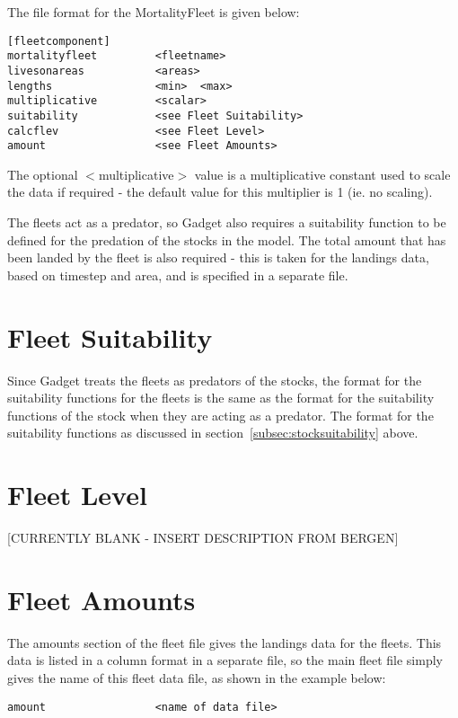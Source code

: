 \documentclass [a4paper, 10pt]{book}
\begin{document}
\bigskip
The file format for the MortalityFleet is given below:

\begin{verbatim}
[fleetcomponent]
mortalityfleet         <fleetname>
livesonareas           <areas>
lengths                <min>  <max>
multiplicative         <scalar>
suitability            <see Fleet Suitability>
calcflev               <see Fleet Level>
amount                 <see Fleet Amounts>
\end{verbatim}

The optional $<$multiplicative$>$ value is a multiplicative constant used to scale the data if required - the default value for this multiplier is 1 (ie. no scaling).

\bigskip
The fleets act as a predator, so Gadget also requires a suitability function to be defined for the predation of the stocks in the model.  The total amount that has been landed by the fleet is also required - this is taken for the landings data, based on timestep and area, and is specified in a separate file.

\section{Fleet Suitability}\label{sec:fleetsuit}
Since Gadget treats the fleets as predators of the stocks, the format for the suitability functions for the fleets is the same as the format for the suitability functions of the stock when they are acting as a predator.  The format for the suitability functions as discussed in section~\ref{subsec:stocksuitability} above.

\section{Fleet Level}\label{sec:fleetlevel}
[CURRENTLY BLANK - INSERT DESCRIPTION FROM BERGEN]

\section{Fleet Amounts}\label{sec:fleetamount}
The amounts section of the fleet file gives the landings data for the fleets.  This data is listed in a column format in a separate file, so the main fleet file simply gives the name of this fleet data file, as shown in the example below:

\begin{verbatim}
amount                 <name of data file>
\end{verbatim}
\end{document}

